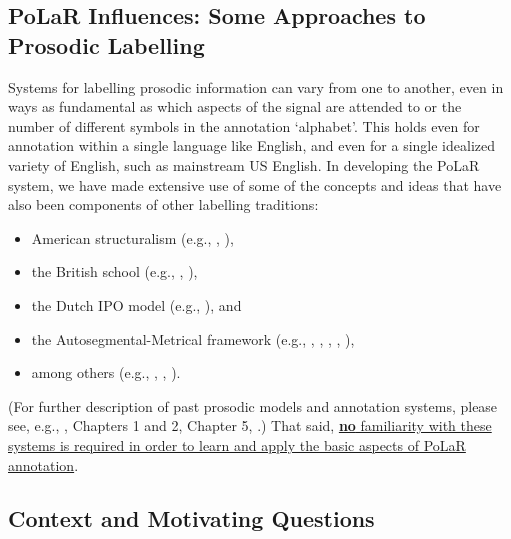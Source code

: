 \documentclass[11pt, twoside]{memoir}
\begin{document}
\subsection{PoLaR Influences: Some Approaches to Prosodic Labelling}\label{sec:past-approaches-to-prosodic-labelling}

Systems for labelling prosodic information can vary from one to another, even in ways as fundamental as which aspects of the signal are attended to or the number of different symbols in the annotation ‘alphabet’. This holds even for annotation within a single language like English, and even for a single idealized variety of English, such as mainstream US English. In developing the PoLaR system, we have made extensive use of some of the concepts and ideas that have also been components of other labelling traditions:

\begin{itemize}
\item American structuralism (e.g., \citealt{pike45}, \citealt{tragersmith51}),
\item the British school (e.g., \citealt{crystal69}, \citealt{oconnorarnold73}),
\item the Dutch IPO model (e.g., \citealt{t-hart-90}), and
\item the Autosegmental-Metrical framework (e.g., \citealt{pierrehumbert80}, \citealt{beckmanayers97}, \citealt{grabe-01}, \citealt{hualdeprieto16}, \citealt{dilleybreen18}),
\item among others (e.g., \citealt{hirst07}, \citealt{taylor98}, \citealt{xu12}).
\end{itemize}

(For further description of past prosodic models and annotation systems, please see, e.g., \citealt{roach94}, \citealt{ladd08} Chapters 1 and 2, \citealt{fery17} Chapter 5, \citealt{barnesshattuckhufnagel20}.) That said, \uline{\textbf{no} familiarity with these systems is required in order to learn and apply the basic aspects of PoLaR annotation}.

\subsection{Context and Motivating Questions}\label{sec:context-and-motivating-questions}
\end{document}
